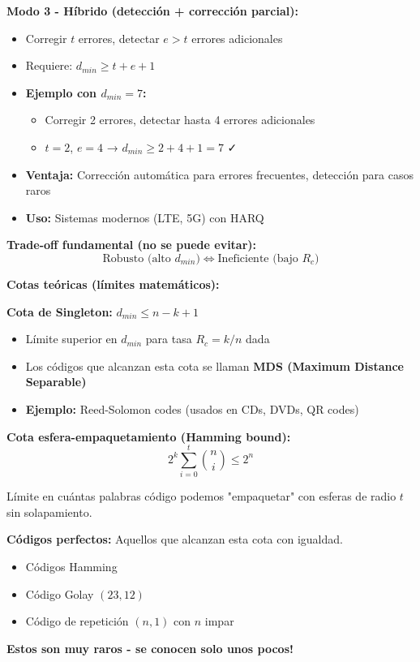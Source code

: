 \documentclass[10pt,a4paper]{article}
\begin{document}
\textbf{Modo 3 - Híbrido (detección + corrección parcial):}
\begin{itemize}
\item Corregir $t$ errores, detectar $e > t$ errores adicionales
\item Requiere: $d_{min} \geq t + e + 1$
\item \textbf{Ejemplo con $d_{min}=7$:}
  \begin{itemize}
  \item Corregir 2 errores, detectar hasta 4 errores adicionales
  \item $t=2$, $e=4$ → $d_{min} \geq 2+4+1=7$ ✓
  \end{itemize}
\item \textbf{Ventaja:} Corrección automática para errores frecuentes, detección para casos raros
\item \textbf{Uso:} Sistemas modernos (LTE, 5G) con HARQ
\end{itemize}

\textbf{Trade-off fundamental (no se puede evitar):}
$$\text{Robusto (alto }d_{min}\text{)} \Leftrightarrow \text{Ineficiente (bajo }R_c\text{)}$$

\textbf{Cotas teóricas (límites matemáticos):}

\textbf{Cota de Singleton:} $d_{min} \leq n - k + 1$
\begin{itemize}
\item Límite superior en $d_{min}$ para tasa $R_c = k/n$ dada
\item Los códigos que alcanzan esta cota se llaman \textbf{MDS (Maximum Distance Separable)}
\item \textbf{Ejemplo:} Reed-Solomon codes (usados en CDs, DVDs, QR codes)
\end{itemize}

\textbf{Cota esfera-empaquetamiento (Hamming bound):}
$$2^k \sum_{i=0}^{t} \binom{n}{i} \leq 2^n$$

Límite en cuántas palabras código podemos "empaquetar" con esferas de radio $t$ sin solapamiento.

\textbf{Códigos perfectos:} Aquellos que alcanzan esta cota con igualdad.
\begin{itemize}
\item Códigos Hamming
\item Código Golay $(23,12)$
\item Código de repetición $(n,1)$ con $n$ impar
\end{itemize}

\textbf{Estos son muy raros - se conocen solo unos pocos!}
\end{document}
